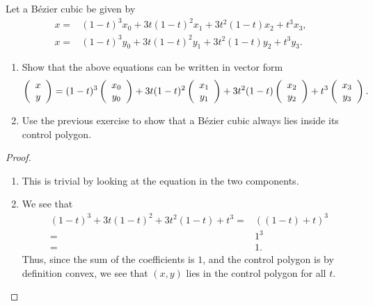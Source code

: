 \begin{exercise}{15}
    Let a B\'ezier cubic be given by
    \begin{align*}
        x =& (1-t)^3 x_0 + 3t(1-t)^2 x_1 + 3t^2 (1-t) x_2 + t^3 x_3,\\
        x =& (1-t)^3 y_0 + 3t(1-t)^2 y_1 + 3t^2 (1-t) y_2 + t^3 y_3.        
    \end{align*}
    
    \begin{enumerate}
        \item Show that the above equations can be written in vector form
        \begin{align*}
            \left( 
            \begin{array}{c} 
                x\\ 
                y
            \end{array}\right)
            = (1-t)^3 
            \left( 
            \begin{array}{c} 
                x_0\\ 
                y_0
            \end{array}\right) 
            + 3t(1-t)^2 
            \left( 
            \begin{array}{c} 
                x_1\\ 
                y_1
            \end{array}\right) 
            + 3t^2 (1-t) 
            \left( 
            \begin{array}{c} 
                x_2\\ 
                y_2
            \end{array}\right) 
            + t^3 
            \left( 
            \begin{array}{c} 
                x_3\\ 
                y_3
            \end{array}\right).
        \end{align*}
        \item Use the previous exercise to show that a B\'{e}zier cubic always lies inside its control polygon.
    \end{enumerate}
\end{exercise}
\begin{proof}
    \begin{enumerate}
        \item This is trivial by looking at the equation in the two components. 
        \item We see that
        \begin{align*}
            (1-t)^3 + 3t(1-t)^2 + 3t^2 (1-t) + t^3
            =& ( (1-t) + t)^3\\
            =& 1^3\\
            =& 1.
        \end{align*}
        Thus, since the sum of the coefficients is $1$, and the control polygon is by definition convex, we see that $(x,y)$ lies in the control polygon for all $t$.
    \end{enumerate}
\end{proof}

